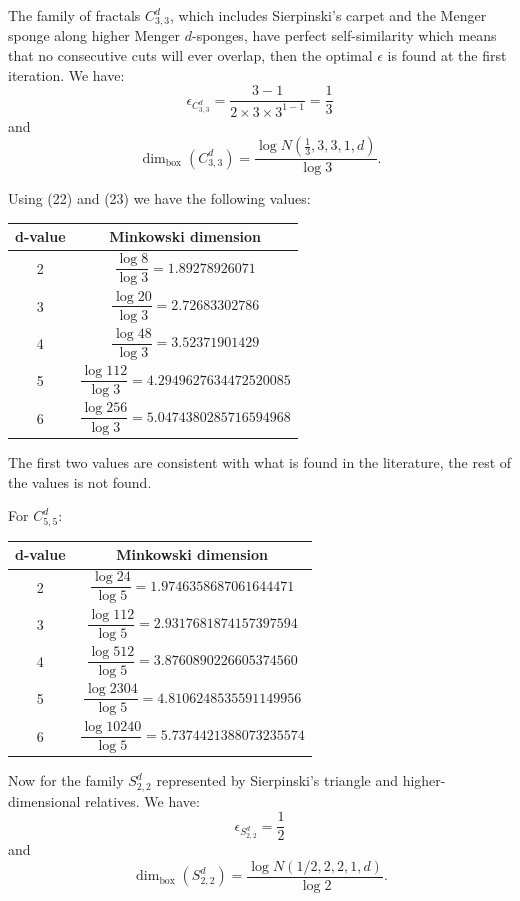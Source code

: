 \documentclass[11pt]{article}
\begin{document}
The family of fractals $C_{3,3}^d$, which includes Sierpinski's carpet and the Menger sponge along higher Menger $d$-sponges, have perfect self-similarity which means that no consecutive cuts will ever overlap, then the optimal $\epsilon$ is found at the first iteration. We have:
\[
\epsilon_{C_{3,3}^d}=\frac{3-1}{2\times 3\times 3^{1-1}}=\frac{1}{3}
\]
and
\[
\dim_{\mathrm{box}}(C_{3,3}^d)=\frac{\log N\!\left(\frac{1}{3},3,3,1,d\right)}{\log 3}.
\]

Using (22) and (23) we have the following values:

\begin{center}
\begin{tabular}{|c|c|}
\hline
d-value & Minkowski dimension\\
\hline
2 & $\dfrac{\log 8}{\log 3}=1.89278926071$\\
3 & $\dfrac{\log 20}{\log 3}=2.72683302786$\\
4 & $\dfrac{\log 48}{\log 3}=3.52371901429$\\
5 & $\dfrac{\log 112}{\log 3}=4.2949627634472520085$\\
6 & $\dfrac{\log 256}{\log 3}=5.0474380285716594968$\\
\hline
\end{tabular}
\end{center}

The first two values are consistent with what is found in the literature, the rest of the values is not found.

For $C_{5,5}^d$:

\begin{center}
\begin{tabular}{|c|c|}
\hline
d-value & Minkowski dimension\\
\hline
2 & $\dfrac{\log 24}{\log 5}=1.9746358687061644471$\\
3 & $\dfrac{\log 112}{\log 5}=2.9317681874157397594$\\
4 & $\dfrac{\log 512}{\log 5}=3.8760890226605374560$\\
5 & $\dfrac{\log 2304}{\log 5}=4.8106248535591149956$\\
6 & $\dfrac{\log 10240}{\log 5}=5.7374421388073235574$\\
\hline
\end{tabular}
\end{center}

Now for the family $S_{2,2}^d$ represented by Sierpinski's triangle and higher-dimensional relatives. We have:
\[
\epsilon_{S_{2,2}^d}=\frac{1}{2}
\]
and
\[
\dim_{\mathrm{box}}(S_{2,2}^d)=\frac{\log N(1/2,2,2,1,d)}{\log 2}.
\]
\end{document}
